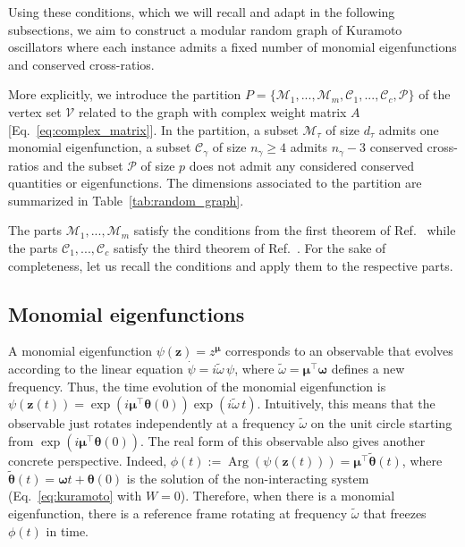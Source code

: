 \documentclass[aps,pre,reprint,longbibliography,superscriptaddress,noshowpacs,floatfix]{revtex4-2}
\theoremstyle{definition}
\theoremstyle{remark}
\DeclareMathOperator{\Arg}{Arg}
\begin{document}
Using these conditions, which we will recall and adapt in the following subsections, we aim to construct a modular random graph of Kuramoto oscillators where each instance admits a fixed number of monomial eigenfunctions and conserved cross-ratios. 

More explicitly, we introduce the partition $P = \{\mathcal{M}_1,...,\mathcal{M}_m, \mathcal{C}_1,...,\mathcal{C}_c, \mathcal{P}\}$ of the vertex set $\mathcal{V}$ related to the graph with complex weight matrix $A$ [Eq.~\eqref{eq:complex_matrix}]. In the partition, a subset $\mathcal{M}_\tau$ of size $d_\tau$ admits one monomial eigenfunction, a subset $\mathcal{C}_\gamma$ of size $n_\gamma \geq 4$ admits $n_\gamma - 3$ conserved cross-ratios and the subset $\mathcal{P}$ of size $p$ does not admit any considered conserved quantities or eigenfunctions. The dimensions associated to the partition are summarized in Table~\ref{tab:random_graph}. 

The parts $\mathcal{M}_1,...,\mathcal{M}_m$ satisfy the conditions from the first theorem of Ref.~\cite{Thibeault2026} while the parts $\mathcal{C}_1,...,\mathcal{C}_c$ satisfy the third theorem of Ref.~\cite{Thibeault2026}. For the sake of completeness, let us recall the conditions and apply them to the respective parts. 


\subsection{Monomial eigenfunctions}

A monomial eigenfunction $\psi(\bm{z}) = z^{\bm{\mu}}$ corresponds to an observable that evolves according to the linear equation $\dot{\psi} = i\tilde{\omega}\,\psi$, where $\tilde{\omega} = \bm{\mu}^\top \bm\omega$ defines a new frequency. Thus, the time evolution of the monomial eigenfunction is $\psi(\bm{z}(t)) = \exp(i\bm{\mu}^\top \bm\theta(0))\exp(i\tilde{\omega} \,t)$. Intuitively, this means that the observable just rotates independently at a frequency $\tilde{\omega}$ on the unit circle starting from $\exp(i\bm{\mu}^\top \bm\theta(0))$. The real form of this observable also gives another concrete perspective. Indeed, $\phi(t) := \Arg(\psi(\bm{z}(t))) = \bm{\mu}^\top\tilde{\bm{\theta}}(t)$, where $\tilde{\bm{\theta}}(t) = \bm\omega t + \bm{\theta}(0)$ is the solution of the non-interacting system (Eq.~\eqref{eq:kuramoto} with $W = 0$). Therefore, when there is a monomial eigenfunction, there is a reference frame rotating at frequency $\tilde{\omega}$ that freezes $\phi(t)$ in time.
\end{document}
